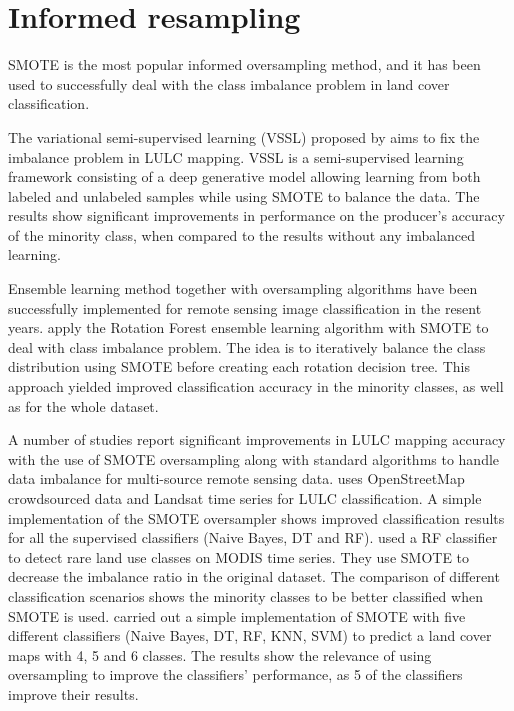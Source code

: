 \documentclass[parskip=full]{scrartcl}
\begin{document}
\section{Informed resampling}

SMOTE is the most popular informed oversampling method, and it has been used to
successfully deal with the class imbalance problem in land cover classification.

The variational semi-supervised learning (VSSL) proposed by \cite{Cenggoro2018}
aims to fix the imbalance problem in LULC mapping. VSSL is a semi-supervised
learning framework consisting of a deep generative model allowing learning from
both labeled and unlabeled samples while using SMOTE to balance the data. The
results show significant improvements in performance on the producer’s accuracy
of the minority class, when compared to the results without any imbalanced
learning.

Ensemble learning method together with oversampling algorithms have been
successfully implemented for remote sensing image classification in the resent
years. \cite{Feng2018, Feng2019} apply the Rotation Forest ensemble learning
algorithm with SMOTE to deal with class imbalance problem. The idea is to
iteratively balance the class distribution using SMOTE before creating each
rotation decision tree. This approach yielded improved classification accuracy
in the minority classes, as well as for the whole dataset.

A number of studies report significant improvements in LULC mapping accuracy
with the use of SMOTE oversampling along with standard algorithms to handle data
imbalance for multi-source remote sensing data. \cite{Johnson2016} uses
OpenStreetMap crowdsourced data and Landsat time series for LULC classification.
A simple implementation of the SMOTE oversampler shows improved classification
results for all the supervised classifiers (Naive Bayes, DT and RF).
\cite{Bogner2018} used a RF classifier to detect rare land use classes on MODIS
time series. They use SMOTE to decrease the imbalance ratio in the original
dataset. The comparison of different classification scenarios shows the minority
classes to be better classified when SMOTE is used. \cite{Panda2018} carried out
a simple implementation of SMOTE with five different classifiers (Naive Bayes,
DT, RF, KNN, SVM) to predict a land cover maps with 4, 5 and 6 classes. The
results show the relevance of using oversampling to improve the classifiers'
performance, as 5 of the classifiers improve their results.
\end{document}
